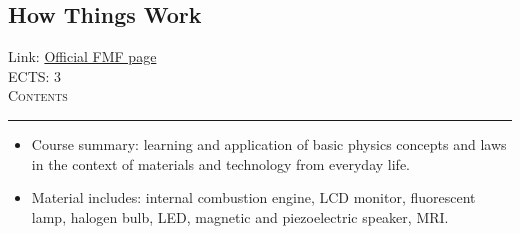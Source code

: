 \documentclass[11pt, a4paper]{article}
\newenvironment{course}[3]{
\subsection{#1}%
Link: \href{#2}{Official FMF page}\\%
ECTS: #3%
\vspace{1ex}
\\
{\large \textsc{Contents}}\\[-0.9ex]%
\rule{\textwidth}{0.5pt}
\vspace{-3ex}
}
{}
\newenvironment{chapter}[1]{
\begin{tcolorbox}[title=#1, breakable]
}
{\end{tcolorbox}}
\begin{document}
\begin{course}{How Things Work}{https://www.fmf.uni-lj.si/en/study-physics/programmes/1fiz/2020/7000777/courses/1151/}{3}
    \label{how-things-work}

    \begin{chapter}{Material}
        \begin{itemize}
        
            \item Course summary: learning and application of basic physics concepts and laws in the context of materials and technology from everyday life.

            \item Material includes: internal combustion engine, LCD monitor, fluorescent lamp, halogen bulb, LED, magnetic and piezoelectric speaker, MRI.
        
        \end{itemize}
    \end{chapter}
\end{course}

\newpage
\end{document}
